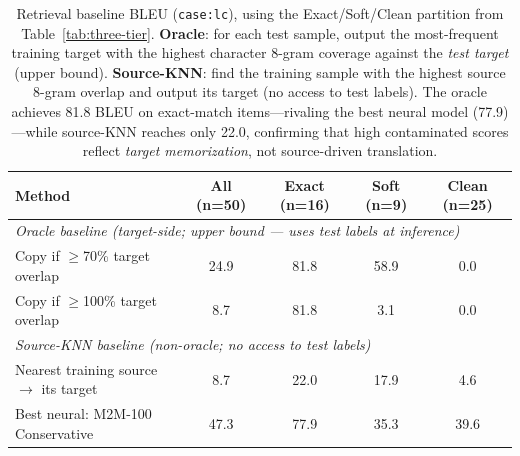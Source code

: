 \begin{table}[t]
\centering
\small
\begin{tabular}{@{}lcccc@{}}
\toprule
\textbf{Method} & \textbf{All (n=50)} & \textbf{Exact (n=16)} & \textbf{Soft (n=9)} & \textbf{Clean (n=25)} \\
\midrule
\multicolumn{5}{l}{\textit{Oracle baseline (target-side; upper bound — uses test labels at inference)}} \\
\quad Copy if $\geq$70\% target overlap  & 24.9 & 81.8 & 58.9 & 0.0 \\
\quad Copy if $\geq$100\% target overlap & 8.7  & 81.8 & 3.1  & 0.0 \\
\midrule
\multicolumn{5}{l}{\textit{Source-KNN baseline (non-oracle; no access to test labels)}} \\
\quad Nearest training source $\rightarrow$ its target & 8.7 & 22.0 & 17.9 & 4.6 \\
\midrule
Best neural: M2M-100 Conservative & 47.3 & 77.9 & 35.3 & 39.6 \\
\bottomrule
\end{tabular}
\caption{Retrieval baseline BLEU (\texttt{case:lc}), using the Exact/Soft/Clean partition from Table~\ref{tab:three-tier}.
\textbf{Oracle}: for each test sample, output the most-frequent training target with the highest character 8-gram coverage against the \emph{test target} (upper bound).
\textbf{Source-KNN}: find the training sample with the highest source 8-gram overlap and output its target (no access to test labels).
The oracle achieves 81.8 BLEU on exact-match items---rivaling the best neural model (77.9)---while source-KNN reaches only 22.0, confirming that high contaminated scores reflect \emph{target memorization}, not source-driven translation.}
\label{tab:retrieval-baseline}
\end{table}
